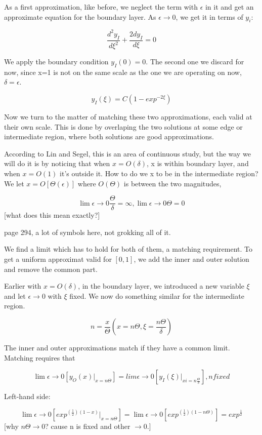 \documentclass[12pt]{report}
\begin{document}
As a first approximation, like before, we neglect the term with $\epsilon$ in it
and get an approximate equation for the boundary layer. As $\epsilon \to 0$, we
get it in terms of $y_i$:

$$\frac{d^2y_I}{d\xi^2} + \frac{2dy_I}{d\xi} = 0$$

We apply the boundary condition $y_I(0) = 0$. The second one we discard for now,
since x=1 is not on the same scale as the one we are operating on now,
$\delta=\epsilon$.

$$y_I(\xi) = C(1-exp^{-2\xi})$$

Now we turn to the matter of matching these two approximations, each valid at
their own scale. This is done by overlaping the two solutions at some edge or
intermediate region, where both solutions are good approximations.

According to Lin and Segel, this is an area of continuous study, but the way we
will do it is by noticing that when $x=O(\delta)$, x is within boundary layer,
and when $x=O(1)$ it's outside it. How to do we x to be in the intermediate
region? We let $x=O[\Theta(\epsilon)]$ where $O(\Theta)$ is between the two
magnitudes,

$$\lim \epsilon \to 0 \frac \Theta \delta = \infty, \lim \epsilon \to 0 \Theta =
0$$ [what does this mean exactly?]

page 294, a lot of symbols here, not grokking all of it.

We find a limit which has to hold for both of them, a matching requirement. To
get a uniform approximat valid for $[0,1]$, we add the inner and outer solution
and remove the common part.

Earlier with $x=O(\delta)$, in the boundary layer, we introduced a new variable
$\xi$ and let $\epsilon \to 0$ with $\xi$ fixed. We now do something similar for
the intermediate region.

$$n = \frac x \Theta  (x = n \Theta, \xi = \frac{n \Theta}{\delta})$$

The inner and outer approximations match if they have a common limit. Matching
requires that

$$\lim \epsilon \to 0[y_O(x) |_{x=n \Theta}] = lim \epsilon \to
0[y_I(\xi)|_{xi=n \frac \Theta \delta}], n fixed$$

Left-hand side:

$$\lim \epsilon \to 0[exp^{(\frac 1 2)(1-x)} |_{x=n \Theta}] = \lim \epsilon \to
0[exp^{(\frac 1 2)(1- n \Theta)}] = exp^{\frac 1 2} $$ [why $n \Theta \to 0$?
cause n is fixed and other $\to 0$.]
\end{document}
